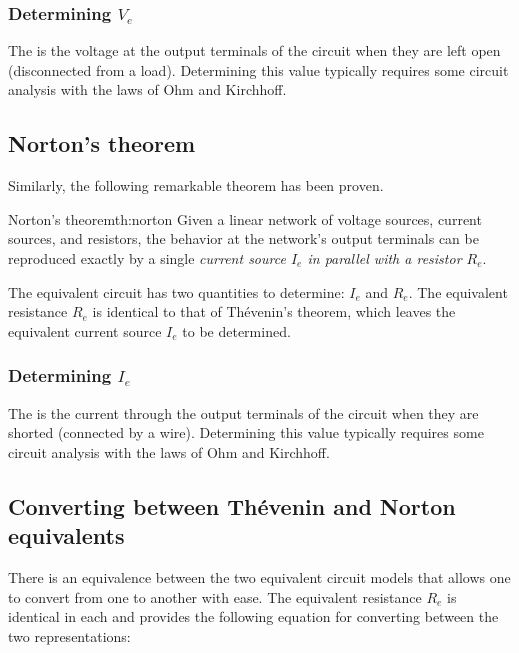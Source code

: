 \documentclass[electronics.tex]{subfiles}
\begin{document}
\subsubsection{Determining $V_e$}

The  is the voltage at the output terminals of the circuit when they are left open (disconnected from a load).
Determining this value typically requires some circuit analysis with the laws of Ohm and Kirchhoff.

\subsection{Norton's theorem}
\tags{}

Similarly, the following remarkable theorem has been proven.
\tags{}

\begin{Theorem}{Norton's theorem}{th:norton}
  Given a linear network of voltage sources, current sources, and resistors, the behavior at the network's output terminals can be reproduced exactly by a single \emph{current source $I_e$ in parallel with a resistor $R_e$}.
\end{Theorem}

The equivalent circuit has two quantities to determine: $I_e$ and $R_e$.
The equivalent resistance $R_e$ is identical to that of Th\'evenin's theorem, which leaves the equivalent current source $I_e$ to be determined.

\subsubsection{Determining $I_e$}

The  is the current through the output terminals of the circuit when they are shorted (connected by a wire).
Determining this value typically requires some circuit analysis with the laws of Ohm and Kirchhoff.
\tags{}

\subsection{Converting between Th\'evenin and Norton equivalents}
\tags{}

There is an equivalence between the two equivalent circuit models that allows one to convert from one to another with ease.
The equivalent resistance $R_e$ is identical in each and provides the following equation for converting between the two representations:
\end{document}
